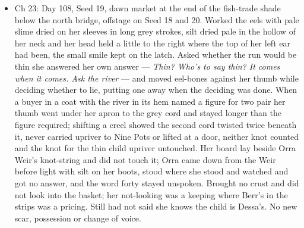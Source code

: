 \documentclass{design/chronicle}
\begin{document}
{\begin{itemize}[leftmargin=1.4em,itemsep=1pt,topsep=3pt,parsep=0pt]
\item Ch 23: Day 108, Seed 19, dawn market at the end of the fish-trade shade below the north bridge, offstage on Seed 18 and 20. Worked the eels with pale slime dried on her sleeves in long grey strokes, silt dried pale in the hollow of her neck and her head held a little to the right where the top of her left ear had been, the small smile kept on the latch. Asked whether the run would be thin she answered her own answer — \emph{Thin? Who’s to say thin? It comes when it comes. Ask the river} — and moved eel-bones against her thumb while deciding whether to lie, putting one away when the deciding was done. When a buyer in a coat with the river in its hem named a figure for two pair her thumb went under her apron to the grey cord and stayed longer than the figure required; shifting a creel showed the second cord twisted twice beneath it, never carried upriver to Nine Pots or lifted at a door, neither knot counted and the knot for the thin child upriver untouched. Her board lay beside Orra Weir’s knot-string and did not touch it; Orra came down from the Weir before light with silt on her boots, stood where she stood and watched and got no answer, and the word forty stayed unspoken. Brought no crust and did not look into the basket; her not-looking was a keeping where Berr’s in the strips was a pricing. Still had not said she knows the child is Dessa’s. No new scar, possession or change of voice.

\end{itemize}

\begin{itemize}[leftmargin=1.4em,itemsep=1pt,topsep=3pt,parsep=0pt]


\end{itemize}}
\end{document}
